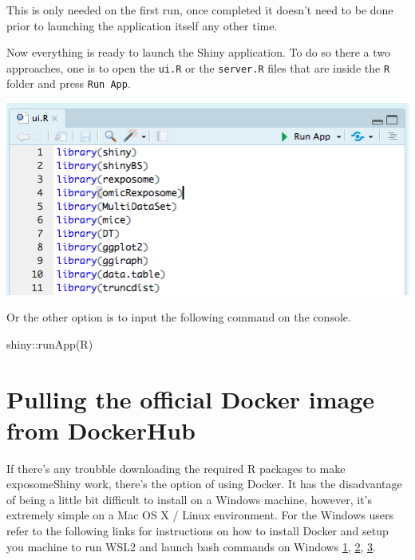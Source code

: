 \documentclass[
]{book}
\newenvironment{Shaded}{\begin{snugshade}}{\end{snugshade}}
\newcommand{\FunctionTok}[1]{\textcolor[rgb]{0.00,0.00,0.00}{#1}}
\newcommand{\NormalTok}[1]{#1}
\newcommand{\SpecialCharTok}[1]{\textcolor[rgb]{0.00,0.00,0.00}{#1}}
\newcommand{\StringTok}[1]{\textcolor[rgb]{0.31,0.60,0.02}{#1}}
\begin{document}
This is only needed on the first run, once completed it doesn't need to be done prior to launching the application itself any other time.

Now everything is ready to launch the Shiny application. To do so there a two approaches, one is to open the \texttt{ui.R} or the \texttt{server.R} files that are inside the \texttt{R} folder and press \texttt{Run\ App}.

\includegraphics{images/setup2.png}

Or the other option is to input the following command on the console.

\begin{Shaded}
\begin{Highlighting}[]
\NormalTok{shiny}\SpecialCharTok{::}\FunctionTok{runApp}\NormalTok{(}\StringTok{\textquotesingle{}R\textquotesingle{}}\NormalTok{)}
\end{Highlighting}
\end{Shaded}

\hypertarget{pulling-the-official-docker-image-from-dockerhub}{%
\section{Pulling the official Docker image from DockerHub}\label{pulling-the-official-docker-image-from-dockerhub}}

If there's any troubble downloading the required R packages to make exposomeShiny work, there's the option of using Docker. It has the disadvantage of being a little bit difficult to install on a Windows machine, however, it's extremely simple on a Mac OS X / Linux environment. For the Windows users refer to the following links for instructions on how to install Docker and setup you machine to run WSL2 and launch bash commands on Windows \href{https://docs.docker.com/docker-for-windows/install-windows-home/}{1}, \href{https://blog.nillsf.com/index.php/2020/02/17/setting-up-wsl2-windows-terminal-and-oh-my-zsh/}{2}, \href{https://docs.docker.com/docker-for-windows/wsl/}{3}.
\end{document}
